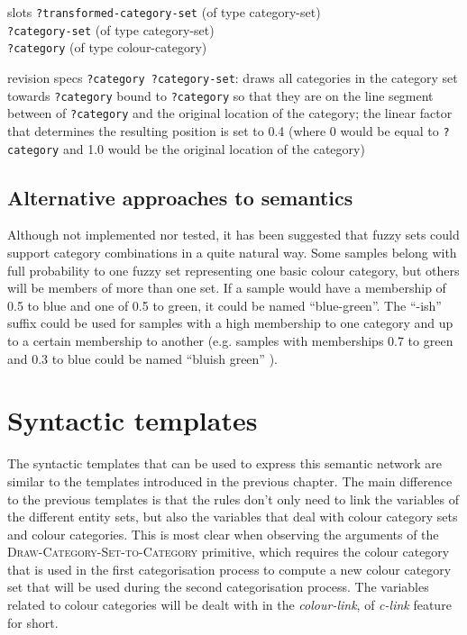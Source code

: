 \begin{explanation}{slots}
  \verb+?transformed-category-set+ (of type category-set) \\
  \verb+?category-set+ (of type category-set) \\
  \verb+?category+ (of type colour-category)
\end{explanation}

\begin{explanation}{revision specs}
  \verb+?category ?category-set+: draws all categories in the category
  set towards \verb+?category+ bound to \verb+?category+ so that they
  are on the line segment between of \verb+?category+ and the original
  location of the category; the linear factor that determines the
  resulting position is set to 0.4 (where 0 would be equal to
  \verb+?category+ and 1.0 would be the original location of the
  category)
\end{explanation}

\subsection{Alternative approaches to semantics}

Although not implemented nor tested, it has been suggested that fuzzy
sets could support category combinations in a quite natural way. Some
samples belong with full probability to one fuzzy set representing one
basic colour category, but others will be members of more than one
set. If a sample would have a membership of 0.5 to blue and one of 0.5 to
green, it could be named ``blue-green''. The ``-ish'' suffix could be
used for samples with a high membership to one category and up to a
certain membership to another (e.g. samples with memberships 0.7 to
green and 0.3 to blue could be named ``bluish green''
\citep{benavente08parametric}).

\section{Syntactic templates}

The syntactic templates that can be used to express this semantic
network are similar to the templates introduced in the previous
chapter. The main difference to the previous templates is that the
rules don't only need to link the variables of the different entity
sets, but also the variables that deal with colour category sets and
colour categories. This is most clear when observing the arguments of
the \textsc{Draw-Category-Set-to-Category} primitive, which requires
the colour category that is used in the first categorisation process
to compute a new colour category set that will be used during the
second categorisation process. The variables related to colour
categories will be dealt with in the \emph{colour-link}, of
\emph{c-link} feature for short.

